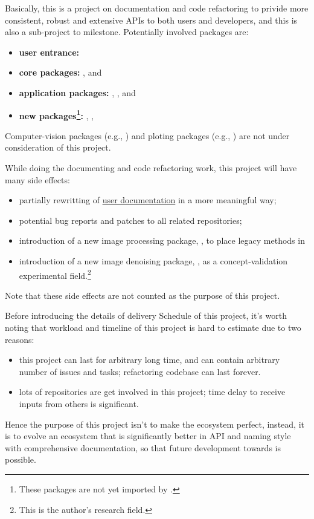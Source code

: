 Basically, this is a project on documentation and code refactoring to privide more consistent, robust and extensive APIs to both users and developers, and this is also a sub-project to \images{}  milestone. Potentially involved packages are:
\begin{itemize}
    \item \textbf{user entrance:} \repoimages
    \item \textbf{core packages:} \repoimagecore, \repoimageaxes and \repoimagemetadata
    \item \textbf{application packages:} \repoimagemorphology, \repoimagetransformations, \repoimagedistance and \repoimagefiltering
    \item \textbf{new packages\footnote{These packages are not yet imported by \images.}:} \repoimagebinarization, \repohistogramthresholding, \repoimageinpainting
\end{itemize}
Computer-vision packages (e.g., \repoimagetracking) and ploting packages (e.g., \repoimageview) are not under consideration of this project.\par

While doing the documenting and code refactoring work, this project will have many side effects:
\begin{itemize}
    \item partially rewritting of \href{https://juliaimages.org}{user documentation} in a more meaningful way;
    \item potential bug reports and patches to all related \langjulia repositories;
    \item introduction of a new image processing package, , to place legacy methods in \images
    \item introduction of a new image denoising package, \repoimagenoise, as a concept-validation experimental field.\footnote{This is the author's research field.}
\end{itemize}
Note that these side effects are not counted as the purpose of this project.\par

Before introducing the details of delivery Schedule of this project, it's worth noting that workload and timeline of this project is hard to estimate due to two reasons:
\begin{itemize}
    \item this project can last for arbitrary long time, and can contain arbitrary number of issues and tasks; refactoring codebase can last forever.
    \item lots of repositories are get involved in this project; time delay to receive inputs from others is significant.
\end{itemize}
Hence the purpose of this project isn't to make the ecosystem perfect, instead, it is to evolve an ecosystem that is significantly better in API and naming style with comprehensive documentation, so that future development towards \images{}  is possible.
